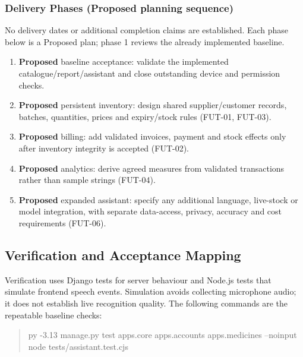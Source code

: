 \documentclass[11pt,a4paper]{article}
\newcommand{\Proposed}{\textbf{Proposed}}
\begin{document}
\subsubsection{Delivery Phases (Proposed planning sequence)}
No delivery dates or additional completion claims are established. Each phase below is a Proposed plan; phase 1 reviews the already implemented baseline.
\begin{enumerate}
\item \Proposed{} baseline acceptance: validate the implemented catalogue/report/assistant and close outstanding device and permission checks.
\item \Proposed{} persistent inventory: design shared supplier/customer records, batches, quantities, prices and expiry/stock rules (FUT-01, FUT-03).
\item \Proposed{} billing: add validated invoices, payment and stock effects only after inventory integrity is accepted (FUT-02).
\item \Proposed{} analytics: derive agreed measures from validated transactions rather than sample strings (FUT-04).
\item \Proposed{} expanded assistant: specify any additional language, live-stock or model integration, with separate data-access, privacy, accuracy and cost requirements (FUT-06).
\end{enumerate}

\subsection{Verification and Acceptance Mapping}
Verification uses Django tests for server behaviour and Node.js tests that simulate frontend speech events. Simulation avoids collecting microphone audio; it does not establish live recognition quality. The following commands are the repeatable baseline checks:
\begin{quote}\small\ttfamily
py -3.13 manage.py test apps.core apps.accounts apps.medicines --noinput\\
node tests/assistant.test.cjs
\end{quote}
\end{document}
